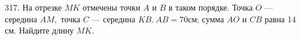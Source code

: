 317. На отрезке $MK$ отмечены точки $A$ и $B$ в таком порядке. Точка $O$ --- середина $AM,$ точка $C$ --- середина $KB.\ AB = 70$см; сумма $AO$ и $CB$ равна 14 см. Найдите длину $MK.$\\
